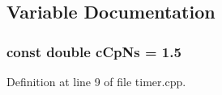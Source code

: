 \subsection{Variable Documentation}
\subsubsection{\setlength{\rightskip}{0pt plus 5cm}const double {\bf cCpNs} = 1.5\hspace{0.3cm}{\tt  [static]}}\label{timer_8cpp_34aff3bb2874be0f0c92d7e17b7105eb}




Definition at line 9 of file timer.cpp.